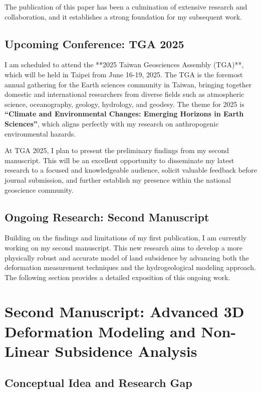 \documentclass[12pt, a4paper]{article}
\begin{document}
	The publication of this paper has been a culmination of extensive research and collaboration, and it establishes a strong foundation for my subsequent work.
	
	\subsection{Upcoming Conference: TGA 2025}
	
	I am scheduled to attend the **2025 Taiwan Geosciences Assembly (TGA)**, which will be held in Taipei from June 16-19, 2025. The TGA is the foremost annual gathering for the Earth sciences community in Taiwan, bringing together domestic and international researchers from diverse fields such as atmospheric science, oceanography, geology, hydrology, and geodesy. The theme for 2025 is \textbf{“Climate and Environmental Changes: Emerging Horizons in Earth Sciences”}, which aligns perfectly with my research on anthropogenic environmental hazards.
	
	At TGA 2025, I plan to present the preliminary findings from my second manuscript. This will be an excellent opportunity to disseminate my latest research to a focused and knowledgeable audience, solicit valuable feedback before journal submission, and further establish my presence within the national geoscience community.
	
	\subsection{Ongoing Research: Second Manuscript}
	
	Building on the findings and limitations of my first publication, I am currently working on my second manuscript. This new research aims to develop a more physically robust and accurate model of land subsidence by advancing both the deformation measurement techniques and the hydrogeological modeling approach. The following section provides a detailed exposition of this ongoing work.
	
	\section{Second Manuscript: Advanced 3D Deformation Modeling and Non-Linear Subsidence Analysis}
	
	\subsection{Conceptual Idea and Research Gap}
	
\end{document}
